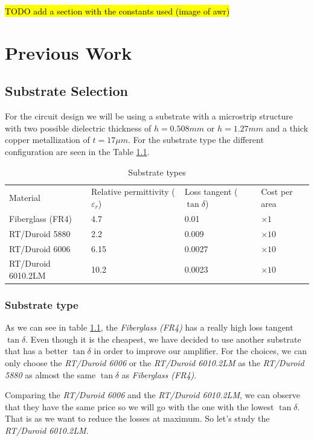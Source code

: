 \documentclass[12pt]{report} %
\newcommand{\todo}[1]{\sethlcolor{green}\hl{TODO #1}}
\begin{document}
\todo{add a section with the constants used (image of awr)}


\chapter{Previous Work}
\section{Substrate Selection}

For the circuit design we will be using a substrate with a microstrip structure with two possible dielectric thickness of $h = 0.508 mm$ or $h = 1.27 mm$ and a thick copper metallization of $t = 17 \mu m$. For the substrate type the different configuration are seen in the Table \ref{tab:previous_work:substrate_types}.

\begin{table}[htbp]
    \centering
    \caption{Substrate types}
    \label{tab:previous_work:substrate_types}
    \begin{tabular}{@{}llll@{}}
    Material & Relative permittivity ($\varepsilon_r$) & Loss tangent ($\tan \delta$) & Cost per area \\
    Fiberglass (FR4) & 4.7 & 0.01 & $\times 1$ \\
    RT/Duroid 5880 & 2.2 & 0.009 & $\times 10$ \\
    RT/Duroid 6006 & 6.15 & 0.0027 & $\times 10$ \\
    RT/Duroid 6010.2LM & 10.2 & 0.0023 & $\times 10$ \\
    \end{tabular}
\end{table}

\subsection{Substrate type}

As we can see in table \ref{tab:previous_work:substrate_types}, the \textit{Fiberglass (FR4)} has a really high loss tangent $\tan \delta$. Even though it is the cheapest, we have decided to use another substrate that has a better $\tan \delta$ in order to improve our amplifier. For the choices, we can only choose the \textit{RT/Duroid 6006} or the \textit{RT/Duroid 6010.2LM} as the \textit{RT/Duroid 5880} as almost the same $\tan \delta$ as \textit{Fiberglass (FR4)}.

Comparing the  \textit{RT/Duroid 6006} and the \textit{RT/Duroid 6010.2LM}, we can observe that they have the same price so we will go with the one with the lowest $\tan \delta$. That is as we want to reduce the losses at maximum. So let's study the \textit{RT/Duroid 6010.2LM}. 
\end{document}
